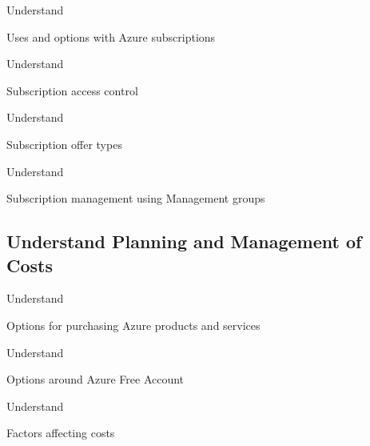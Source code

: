 \documentclass{scrartcl}
\newenvironment{flashcard}[2][]{%
    #1
    \vfill
    \centerline{\Large{#2}}
    \vfill
    \newpage
}
{\newpage}
\newcommand{\subsectioncard}[1]{
    \vspace*{\stretch{1}}
    \subsection{#1}
    \vspace*{\stretch{1}}
    \pagebreak
}
\begin{document}
    \begin{flashcard}[Understand]{Uses and options with Azure subscriptions}

    \end{flashcard}

    \begin{flashcard}[Understand]{Subscription access control}

    \end{flashcard}

    \begin{flashcard}[Understand]{Subscription offer types}

    \end{flashcard}

    \begin{flashcard}[Understand]{Subscription management using Management groups}

    \end{flashcard}

    \subsectioncard{Understand Planning and Management of Costs}

    \begin{flashcard}[Understand]{Options for purchasing Azure products and services}

    \end{flashcard}

    \begin{flashcard}[Understand]{Options around Azure Free Account}

    \end{flashcard}

    \begin{flashcard}[Understand]{Factors affecting costs}

    \end{flashcard}
\end{document}
